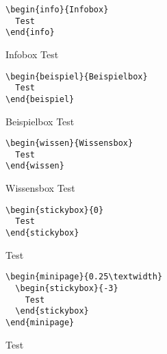 \documentclass[]{arbeitsblatt}
\begin{document}
\begin{verbatim}
\begin{info}{Infobox}
  Test
\end{info}
\end{verbatim}

\begin{info}{Infobox}
  Test
\end{info}



\begin{verbatim}
\begin{beispiel}{Beispielbox}
  Test
\end{beispiel}
\end{verbatim}

\begin{beispiel}{Beispielbox}
  Test
\end{beispiel}



\begin{verbatim}
\begin{wissen}{Wissensbox}
  Test
\end{wissen}
\end{verbatim}

\begin{wissen}{Wissensbox}
  Test
\end{wissen}



\begin{verbatim}
\begin{stickybox}{0}
  Test
\end{stickybox}
\end{verbatim}

\begin{stickybox}{0}
  Test
\end{stickybox}



\begin{verbatim}
\begin{minipage}{0.25\textwidth}
  \begin{stickybox}{-3}
    Test
  \end{stickybox}
\end{minipage}
\end{verbatim}

\begin{minipage}{0.25\textwidth}
  \begin{stickybox}{-3}
    Test
  \end{stickybox}
\end{minipage}
\end{document}
